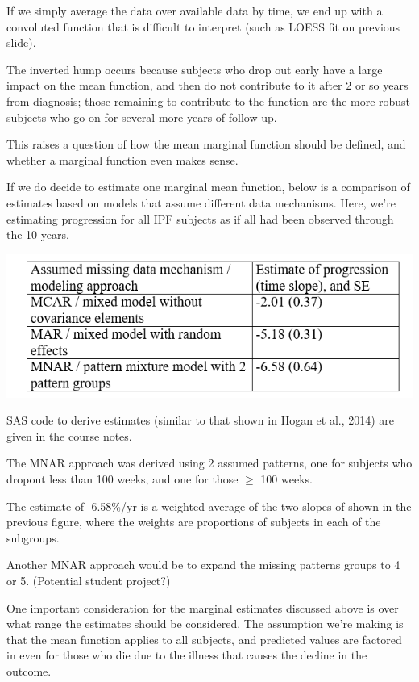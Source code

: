 \documentclass[
  9pt,
  ignorenonframetext,
]{beamer}
\begin{document}
\begin{frame}{}
\protect\hypertarget{section-9}{}
If we simply average the data over available data by time, we end up
with a convoluted function that is difficult to interpret (such as LOESS
fit on previous slide).

The inverted hump occurs because subjects who drop out early have a
large impact on the mean function, and then do not contribute to it
after 2 or so years from diagnosis; those remaining to contribute to the
function are the more robust subjects who go on for several more years
of follow up.

This raises a question of how the mean marginal function should be
defined, and whether a marginal function even makes sense.
\end{frame}

\begin{frame}{}
\protect\hypertarget{section-10}{}
If we do decide to estimate one marginal mean function, below is a
comparison of estimates based on models that assume different data
mechanisms. Here, we're estimating progression for all IPF subjects as
if all had been observed through the 10 years.

\begin{center}\includegraphics[width=0.7\linewidth]{figs_L20/f10} \end{center}

SAS code to derive estimates (similar to that shown in Hogan et al.,
2014) are given in the course notes.
\end{frame}

\begin{frame}{}
\protect\hypertarget{section-11}{}
The MNAR approach was derived using 2 assumed patterns, one for subjects
who dropout less than 100 weeks, and one for those \(\geq\) 100 weeks.

The estimate of -6.58\%/yr is a weighted average of the two slopes of
shown in the previous figure, where the weights are proportions of
subjects in each of the subgroups.

Another MNAR approach would be to expand the missing patterns groups to
4 or 5. (Potential student project?)

One important consideration for the marginal estimates discussed above
is over what range the estimates should be considered. The assumption
we're making is that the mean function applies to all subjects, and
predicted values are factored in even for those who die due to the
illness that causes the decline in the outcome.
\end{frame}
\end{document}
